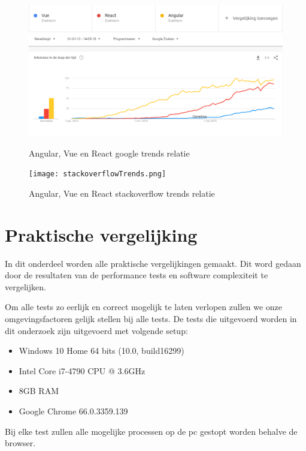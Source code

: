 \begin{figure}[h!]
	\caption{Angular, Vue en React google trends relatie \autocite{_google_2018}}
	\centering
	\includegraphics[width=1\textwidth]{img/googleTrends.png}
	\label{fig:google_trends}
\end{figure}

\begin{figure}[h!]
	\caption{Angular, Vue en React stackoverflow trends relatie \autocite{_stackoverflow_2018}}
	\centering
	\texttt{[image: stackoverflowTrends.png]}
	\label{fig:stackoverflow_trends}
\end{figure}


\section{Praktische vergelijking}
\label{sec:praktische_vergelijking}
In dit onderdeel worden alle praktische vergelijkingen gemaakt. Dit word gedaan door de resultaten van de performance tests en software complexiteit te vergelijken.

Om alle tests zo eerlijk en correct mogelijk te laten verlopen zullen we onze omgevingsfactoren gelijk stellen bij alle tests. De tests die uitgevoerd worden in dit onderzoek zijn uitgevoerd met volgende setup:

\begin{itemize}
	\item Windows 10 Home 64 bits (10.0, build16299)
	\item Intel Core i7-4790 CPU @ 3.6GHz
	\item 8GB RAM
	\item Google Chrome 66.0.3359.139
\end{itemize}

Bij elke test zullen alle mogelijke processen op de pc gestopt worden behalve de browser.


